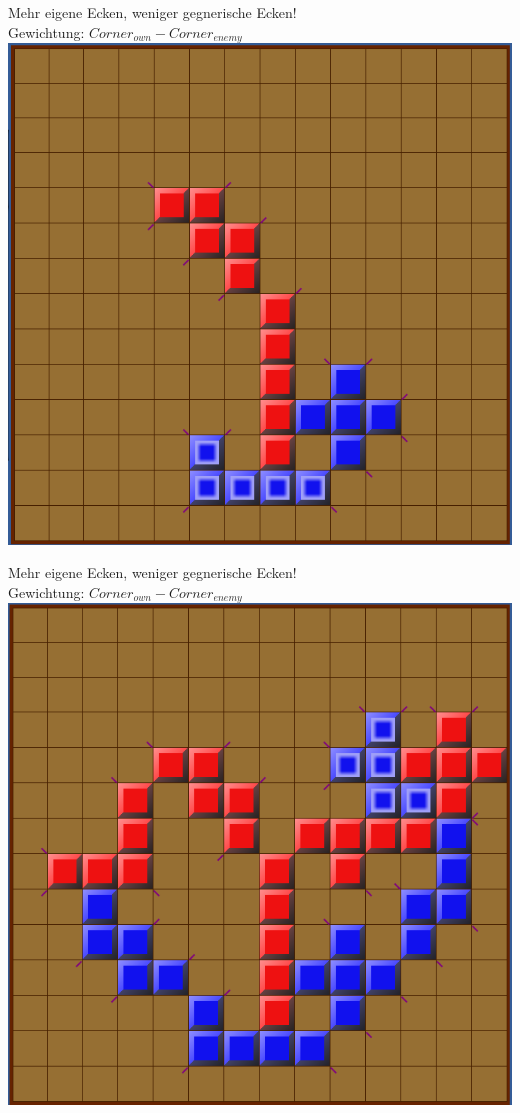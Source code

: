 \documentclass[12pt]{beamer}
\begin{document}
\begin{frame}
	Mehr eigene Ecken, weniger gegnerische Ecken!\\
	\pause
	Gewichtung: $Corner_{own} - Corner_{enemy}$\\
	\pause
	\includegraphics[width=0.6\linewidth]{media/wgh4.png}
\end{frame}
\begin{frame}
	Mehr eigene Ecken, weniger gegnerische Ecken!\\
	Gewichtung: $Corner_{own} - Corner_{enemy}$\\
	\includegraphics[width=0.6\linewidth]{media/wgh5.png}
\end{frame}
\end{document}
